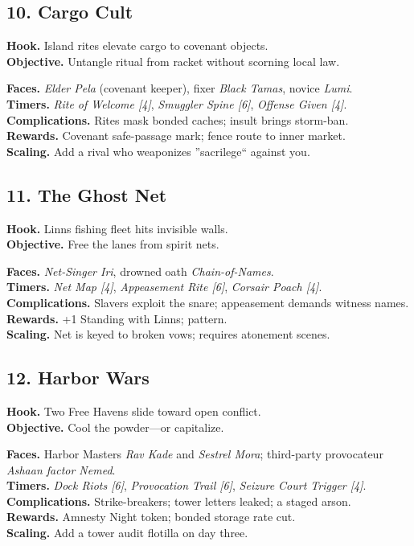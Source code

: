 \documentclass[11pt,oneside]{book}
\newcommand{\tagpill}[1]{\begingroup
  \setlength{\fboxsep}{1pt}\color{black}\fbox{\footnotesize\textsf{#1}}
\endgroup}
\begin{document}
\begin{itemize}
\subsection*{10. Cargo Cult}
\textbf{Hook.} Island rites elevate cargo to covenant objects.\\
\textbf{Objective.} Untangle ritual from racket without scorning local law.

\textbf{Faces.} \emph{Elder Pela} (covenant keeper), fixer \emph{Black Tamas}, novice \emph{Lumi}.\\
\textbf{Timers.} \emph{Rite of Welcome [4]}, \emph{Smuggler Spine [6]}, \emph{Offense Given [4]}.\\
\textbf{Complications.} Rites mask bonded caches; insult brings storm-ban.\\
\textbf{Rewards.} Covenant safe-passage mark; fence route to inner market.\\
\textbf{Scaling.} Add a rival who weaponizes ''sacrilege`` against you.

\subsection*{11. The Ghost Net}
\textbf{Hook.} Linns fishing fleet hits invisible walls.\\
\textbf{Objective.} Free the lanes from spirit nets.

\textbf{Faces.} \emph{Net-Singer Iri}, drowned oath \emph{Chain-of-Names}.\\
\textbf{Timers.} \emph{Net Map [4]}, \emph{Appeasement Rite [6]}, \emph{Corsair Poach [4]}.\\
\textbf{Complications.} Slavers exploit the snare; appeasement demands witness names.\\
\textbf{Rewards.} +1 Standing with Linns; \tagpill{SPIRIT MASK} pattern.\\
\textbf{Scaling.} Net is keyed to broken vows; requires atonement scenes.

\subsection*{12. Harbor Wars}
\textbf{Hook.} Two Free Havens slide toward open conflict.\\
\textbf{Objective.} Cool the powder---or capitalize.

\textbf{Faces.} Harbor Masters \emph{Rav Kade} and \emph{Sestrel Mora}; third-party provocateur \emph{Ashaan factor Nemed}.\\
\textbf{Timers.} \emph{Dock Riots [6]}, \emph{Provocation Trail [6]}, \emph{Seizure Court Trigger [4]}.\\
\textbf{Complications.} Strike-breakers; tower letters leaked; a staged arson.\\
\textbf{Rewards.} Amnesty Night token; bonded storage rate cut.\\
\textbf{Scaling.} Add a tower audit flotilla on day three.


\end{itemize}
\end{document}
